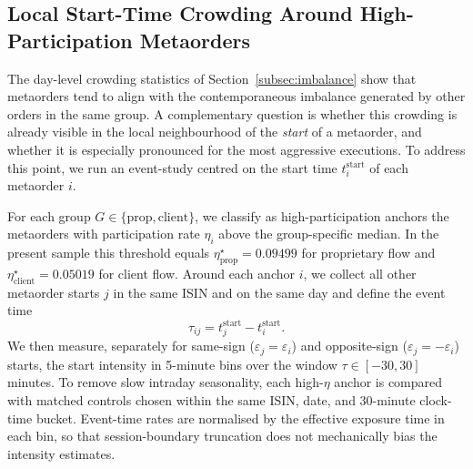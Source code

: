 
\subsection{Local Start-Time Crowding Around High-Participation Metaorders}
\label{subsec:start_event_study}

The day-level crowding statistics of Section~\ref{subsec:imbalance} show that
metaorders tend to align with the contemporaneous imbalance generated by other
orders in the same group. A complementary question is whether this crowding is
already visible in the local neighbourhood of the \emph{start} of a metaorder,
and whether it is especially pronounced for the most aggressive executions. To
address this point, we run an event-study centred on the start time
$t_i^{\mathrm{start}}$ of each metaorder $i$.

For each group $G \in \{\text{prop},\text{client}\}$, we classify as
high-participation anchors the metaorders with participation rate $\eta_i$
above the group-specific median. In the present sample this threshold equals
$\eta_{\mathrm{prop}}^{\star}=0.09499$ for proprietary flow and
$\eta_{\mathrm{client}}^{\star}=0.05019$ for client flow. Around each anchor
$i$, we collect all other metaorder starts $j$ in the same ISIN and on the same
day and define the event time
\begin{equation}
  \tau_{ij} = t_j^{\mathrm{start}} - t_i^{\mathrm{start}}.
\end{equation}
We then measure, separately for same-sign ($\varepsilon_j=\varepsilon_i$) and
opposite-sign ($\varepsilon_j=-\varepsilon_i$) starts, the start intensity in
5-minute bins over the window $\tau \in [-30,30]$ minutes. To remove slow
intraday seasonality, each high-$\eta$ anchor is compared with matched controls
chosen within the same ISIN, date, and 30-minute clock-time bucket. Event-time
rates are normalised by the effective exposure time in each bin, so that
session-boundary truncation does not mechanically bias the intensity estimates.

